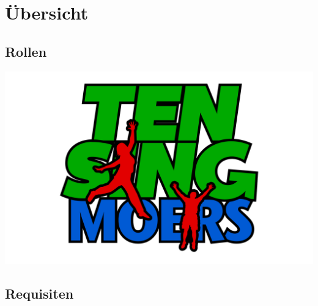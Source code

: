 \pagebreak

\setcounter{section}{-1}
\section{Übersicht}
\subsection{Rollen}
\usehyperlinkstrue
\ListOfPersons
\begin{center}
\vspace*{\fill}
\vspace{-1cm}
\includegraphics[scale=.35,trim=80mm 20mm 80mm 20mm]{res/TEN_SING_Logo}
\vspace{-1cm}
\end{center}
\clearpage
\subsection{Requisiten}
\ListOfRequisites



%
%
%
%
%
%
%
%
%
%
%
%
%
%
%
%


